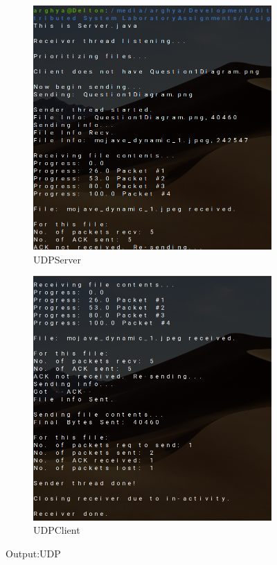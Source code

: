 \documentclass{article}
\begin{document}
\begin{enumerate}

\pagebreak

\pagebreak
\begin{figure}[h]
\begin{subfigure}{.5\textwidth}
\includegraphics[width=350pt]{Output3}
\caption{UDPServer}
\label{TCPServer}
\end{subfigure}
\begin{subfigure}{.5\textwidth}
\includegraphics[width=350pt]{Output4}
\caption{UDPClient}
\label{TCPClient}
\end{subfigure}
\caption{Output:UDP}
\label{fig:UDP}
\end{figure}


\end{enumerate}
\end{document}
